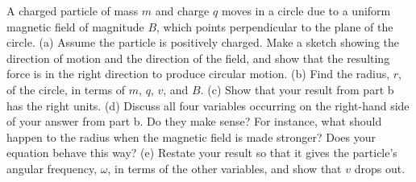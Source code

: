         A charged particle of mass $m$ and charge $q$
        moves in a circle due to a uniform magnetic field of magnitude $B$,
        which points perpendicular to the plane of the circle.\hwendpart
        (a) Assume the particle is positively charged.
        Make a sketch showing the direction of motion and the direction of the
        field, and show that the resulting force is in the right direction to
        produce circular motion.\hwendpart
        (b) Find the radius, $r$, of the circle, in terms of $m$, $q$,
         $v$, and $B$.\answercheck\hwendpart
        (c) Show that your result from part b has the right units.\hwendpart
        (d) Discuss all four variables occurring on the right-hand side of your
        answer from part b. Do they make sense? For instance, what should happen
        to the radius when the magnetic field is made stronger? Does your equation behave
        this way?\hwendpart
        (e) Restate your result so that it gives the particle's angular frequency,
        $\omega$, in terms of the other variables, and show that $v$ drops out.\answercheck\hwendpart
